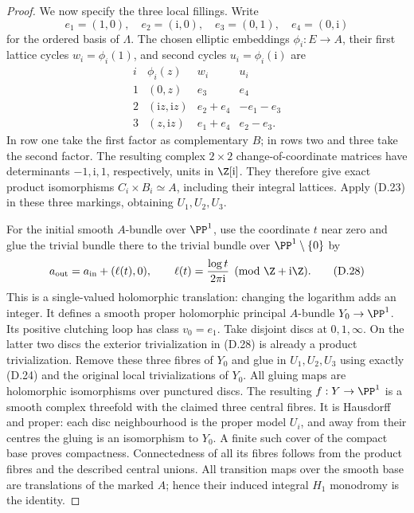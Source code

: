 \begin{proof}
We now specify the three local fillings. Write
\[
 e_1=(1,0),\quad e_2=(\mathrm i,0),\quad
 e_3=(0,1),\quad e_4=(0,\mathrm i)
\]
for the ordered basis of $\Lambda$. The chosen elliptic
embeddings $\phi_i:E\to A$, their first lattice cycles
$w_i=\phi_i(1)$, and second cycles $u_i=\phi_i(\mathrm i)$ are
\[
\begin{array}{c|c|c|c}
 i&\phi_i(z)&w_i&u_i\\ \hline
 1&(0,z)&e_3&e_4\\
 2&(\mathrm i z,\mathrm i z)&e_2+e_4&-e_1-e_3\\
 3&(z,\mathrm i z)&e_1+e_4&e_2-e_3.
\end{array}
\tag{D.27}
\]
In row one take the first factor as complementary $B$; in
rows two and three take the second factor. The resulting
complex $2\times2$ change-of-coordinate matrices have
determinants $-1,\mathrm i,1$, respectively, units in
$\Z[\mathrm i]$. They therefore give exact product
isomorphisms $C_i\times B_i\simeq A$, including their
integral lattices. Apply (D.23) in these three markings,
obtaining $U_1,U_2,U_3$.

For the initial smooth $A$-bundle over $\PP^1$, use the
coordinate $t$ near zero and glue the trivial bundle there
to the trivial bundle over $\PP^1\setminus\{0\}$ by
\[
 a_{\rm out}=a_{\rm in}+(\ell(t),0),
 \qquad \ell(t)=\frac{\log t}{2\pi\mathrm i}\pmod{\Z+\mathrm i\Z}.
\tag{D.28}
\]
This is a single-valued holomorphic translation: changing
the logarithm adds an integer. It defines a smooth proper
holomorphic principal $A$-bundle $Y_0\to\PP^1$.
Its positive clutching loop has class $v_0=e_1$.
Take disjoint discs at $0,1,\infty$. On the latter two
discs the exterior trivialization in (D.28) is already a
product trivialization. Remove these three fibres of $Y_0$
and glue in $U_1,U_2,U_3$ using exactly (D.24) and the
original local trivializations of $Y_0$. All gluing maps
are holomorphic isomorphisms over punctured discs. The
resulting $f:Y\to\PP^1$ is a smooth complex threefold with
the claimed three central fibres. It is Hausdorff and
proper: each disc neighbourhood is the proper model $U_i$,
and away from their centres the gluing is an isomorphism
to $Y_0$. A finite such cover of the compact base proves
compactness. Connectedness of all its fibres follows
from the product fibres and the described central unions.
All transition maps over the smooth base are translations
of the marked $A$; hence their induced integral $H_1$
monodromy is the identity.


\end{proof}
